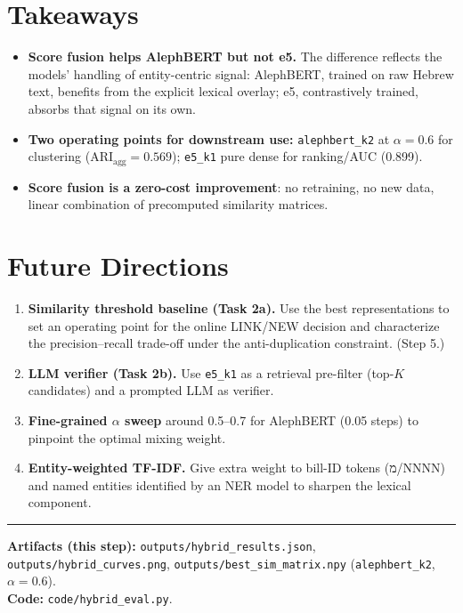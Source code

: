 \documentclass[11pt,a4paper]{article}
\begin{document}
\section{Takeaways}

\begin{itemize}[noitemsep]
  \item \textbf{Score fusion helps AlephBERT but not e5.}  The difference reflects the
        models' handling of entity-centric signal: AlephBERT, trained on raw Hebrew text,
        benefits from the explicit lexical overlay; e5, contrastively trained, absorbs
        that signal on its own.
  \item \textbf{Two operating points for downstream use:}
        \texttt{alephbert\_k2} at $\alpha=0.6$ for clustering (ARI$_\text{agg}=0.569$);
        \texttt{e5\_k1} pure dense for ranking/AUC (0.899).
  \item \textbf{Score fusion is a zero-cost improvement}: no retraining, no new data,
        linear combination of precomputed similarity matrices.
\end{itemize}

\section{Future Directions}

\begin{enumerate}[leftmargin=1.4em]
  \item \textbf{Similarity threshold baseline (Task 2a).}  Use the best representations
        to set an operating point for the online LINK/NEW decision and characterize the
        precision--recall trade-off under the anti-duplication constraint.  (Step 5.)
  \item \textbf{LLM verifier (Task 2b).}  Use \texttt{e5\_k1} as a retrieval pre-filter
        (top-$K$ candidates) and a prompted LLM as verifier.
  \item \textbf{Fine-grained $\alpha$ sweep} around 0.5--0.7 for AlephBERT (0.05 steps)
        to pinpoint the optimal mixing weight.
  \item \textbf{Entity-weighted TF-IDF.}  Give extra weight to bill-ID tokens
        (\texthebrew{מ/NNNN}) and named entities identified by an NER model to sharpen
        the lexical component.
\end{enumerate}

\vspace{1.5em}
\hrule
\vspace{0.4em}
{\small
\textbf{Artifacts (this step):}
\texttt{outputs/hybrid\_results.json},
\texttt{outputs/hybrid\_curves.png},
\texttt{outputs/best\_sim\_matrix.npy} (\texttt{alephbert\_k2}, $\alpha=0.6$).\\
\textbf{Code:} \texttt{code/hybrid\_eval.py}.
}
\end{document}
